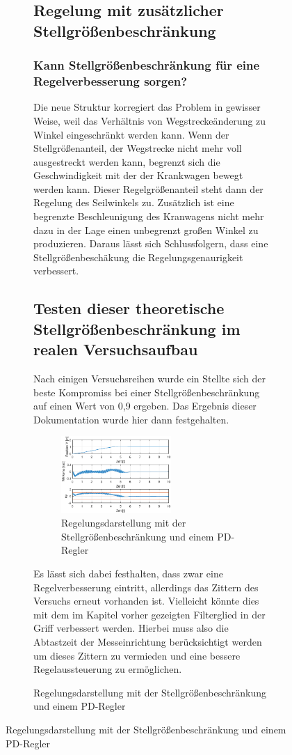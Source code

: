 \documentclass[10pt]{scrartcl}
\begin{document}
\begin{figure}[H]
\begin{figure}
\subsection{Regelung mit zusätzlicher Stellgrößenbeschränkung}
\subsubsection{Kann Stellgrößenbeschränkung für eine Regelverbesserung sorgen?}
Die neue Struktur korregiert das Problem in gewisser Weise, weil das Verhältnis von Wegstreckeänderung zu Winkel eingeschränkt werden kann. Wenn der Stellgrößenanteil, der Wegstrecke nicht mehr voll ausgestreckt werden kann, begrenzt sich die Geschwindigkeit mit der der Krankwagen bewegt werden kann. Dieser Regelgrößenanteil steht dann der Regelung des Seilwinkels zu. Zusätzlich ist eine begrenzte Beschleunigung des Kranwagens nicht mehr dazu in der Lage einen unbegrenzt großen Winkel zu produzieren. Daraus lässt sich Schlussfolgern, dass eine Stellgrößenbeschäkung die Regelungsgenaurigkeit verbessert.
\subsection{Testen dieser theoretische Stellgrößenbeschränkung im realen Versuchsaufbau}
Nach einigen Versuchsreihen wurde ein Stellte sich der beste Kompromiss bei einer Stellgrößenbeschränkung auf einen Wert von 0,9 ergeben. Das Ergebnis dieser Dokumentation wurde hier dann festgehalten.

\begin{figure}[H]
	\centering
	\includegraphics[width=0.6\textwidth]{Figure45b5mitSaturation}
	\caption{Regelungsdarstellung mit der Stellgrößenbeschränkung und einem PD-Regler}
	\label{img:grafik-dummy}
\end{figure}

Es lässt sich dabei festhalten, dass zwar eine Regelverbesserung eintritt, allerdings das Zittern des Versuchs erneut vorhanden ist. Vielleicht könnte dies mit dem im Kapitel vorher gezeigten Filterglied in der Griff verbessert werden. Hierbei muss also die Abtastzeit der Messeinrichtung berücksichtigt werden um dieses Zittern zu vermieden und eine bessere Regelaussteuerung zu ermöglichen.

\end{figure}
\end{figure}
\end{document}
